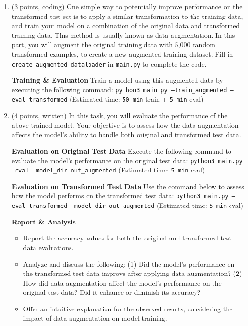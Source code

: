 \documentclass{article}
\theoremstyle{case}
\theoremstyle{definition}
\begin{document}
\begin{enumerate}
    \item (3 points, coding) One simple way to potentially improve performance on the transformed test set is to apply a similar transformation to the training data, and train your model on a combination of the original data and transformed training data. This method is usually known as data augmentation. In this part, you will augment the original training data with 5,000 random transformed examples, to create a new augmented training dataset. Fill in \texttt{create\_augmented\_dataloader} in \texttt{main.py} to complete the code.

    \textbf{Training \& Evaluation} Train a model using this augmented data by executing the following command: \texttt{python3 main.py --train\_augmented --eval\_transformed} (Estimated time: \texttt{50 min} train + \texttt{5 min} eval)



    \newpage
    \item (4 points, written) In this task, you will evaluate the performance of the above trained model. Your objective is to assess how the data augmentation affects the model's ability to handle both original and transformed test data.


    \textbf{Evaluation on Original Test Data} Execute the following command to evaluate the model's performance on the original test data:
    \texttt{python3 main.py --eval --model\_dir out\_augmented} (Estimated time: \texttt{5 min} eval)

    \textbf{Evaluation on Transformed Test Data} Use the command below to assess how the model performs on the transformed test data: \texttt{python3 main.py --eval\_transformed --model\_dir out\_augmented} (Estimated time: \texttt{5 min} eval)

    \textbf{Report \& Analysis}
    \begin{itemize}
        \item Report the accuracy values for both the original and transformed test data evaluations.
        \item Analyze and discuss the following: (1) Did the model's performance on the transformed test data improve after applying data augmentation? (2) How did data augmentation affect the model's performance on the original test data? Did it enhance or diminish its accuracy?
        \item Offer an intuitive explanation for the observed results, considering the impact of data augmentation on model training.
    \end{itemize}


\end{enumerate}
\end{document}

